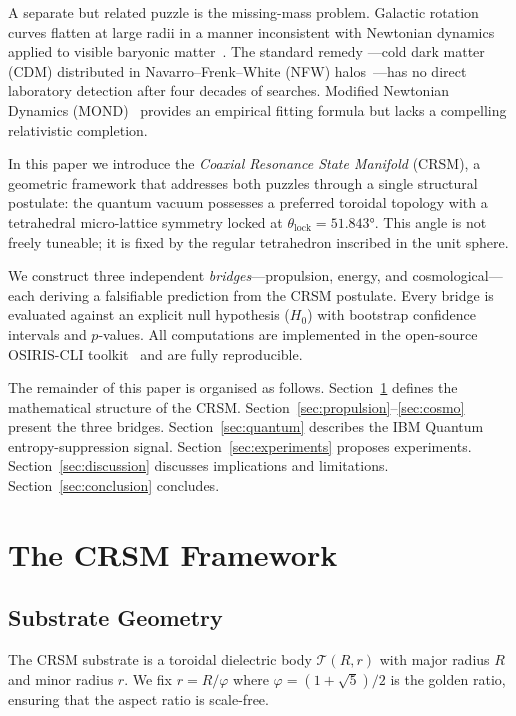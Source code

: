 \documentclass[aps,preprint,superscriptaddress,longbibliography]{revtex4-2}
\begin{document}
A separate but related puzzle is the missing-mass problem.
Galactic rotation curves flatten at large radii in a manner
inconsistent with Newtonian dynamics applied to visible
baryonic matter~\cite{rubin1970,sparc}.  The standard remedy
---cold dark matter (CDM) distributed in Navarro--Frenk--White
(NFW) halos~\cite{nfw1997}---has no direct laboratory detection
after four decades of searches.  Modified Newtonian Dynamics
(MOND)~\cite{milgrom1983} provides an empirical fitting formula
but lacks a compelling relativistic completion.

In this paper we introduce the \emph{Coaxial Resonance State
Manifold} (CRSM), a geometric framework that addresses both
puzzles through a single structural postulate: the quantum vacuum
possesses a preferred toroidal topology with a tetrahedral
micro-lattice symmetry locked at $\theta_{\mathrm{lock}} =
\ang{51.843}$.  This angle is not freely tuneable; it is fixed by
the regular tetrahedron inscribed in the unit sphere.

We construct three independent \emph{bridges}---propulsion,
energy, and cosmological---each deriving a falsifiable prediction
from the CRSM postulate.  Every bridge is evaluated against an
explicit null hypothesis ($H_0$) with bootstrap confidence
intervals and $p$-values.  All computations are implemented in the
open-source OSIRIS-CLI toolkit~\cite{osiris_zenodo} and are fully
reproducible.

The remainder of this paper is organised as follows.
Section~\ref{sec:framework} defines the mathematical structure of
the CRSM.  Section~\ref{sec:propulsion}--\ref{sec:cosmo} present
the three bridges.  Section~\ref{sec:quantum} describes the IBM
Quantum entropy-suppression signal.  Section~\ref{sec:experiments}
proposes experiments.  Section~\ref{sec:discussion} discusses
implications and limitations.  Section~\ref{sec:conclusion}
concludes.

\section{The CRSM Framework}
\label{sec:framework}

\subsection{Substrate Geometry}

The CRSM substrate is a toroidal dielectric body
$\mathcal{T}(R, r)$ with major radius $R$ and minor radius $r$.
We fix $r = R / \varphi$ where $\varphi = (1+\sqrt{5})/2$ is the
golden ratio, ensuring that the aspect ratio is scale-free.
\end{document}
